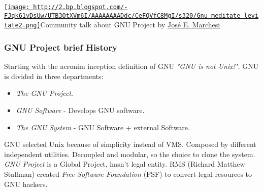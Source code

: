 \href{http://2.bp.blogspot.com/-FJqk61vDsUw/UTB3OtXVm6I/AAAAAAAADdc/CeFQVfC8MgI/s1600/Gnu_meditate_levitate2.png}{
\texttt{[image: http://2.bp.blogspot.com/-FJqk61vDsUw/UTB3OtXVm6I/AAAAAAAADdc/CeFQVfC8MgI/s320/Gnu\_meditate\_levitate2.png]}}Community talk about GNU Project by \href{http://es.gnu.org/~jemarch/}{José E. Marchesi}

\subsubsection{ GNU Project brief History} Starting with the acronim inception definition of GNU \textit{"GNU is not Unix!"}. GNU is divided in three departments:\nolinebreak
\begin{itemize}
	\item \textit{The GNU Project}.
	\item \textit{GNU Software} - Develops GNU software.
	\item \textit{The GNU System} - GNU Software + external Software.
\end{itemize} GNU selected Unix because of simplicity instead of VMS. Composed by different independent utilities. Decoupled and modular, so the choice to clone the system.
\\\textit{GNU Project} is a Global Project, hasn’t legal entity. RMS (Richard Matthew Stallman) created \textit{Free Software Foundation} (FSF) to convert legal resources to GNU hackers.
\\

